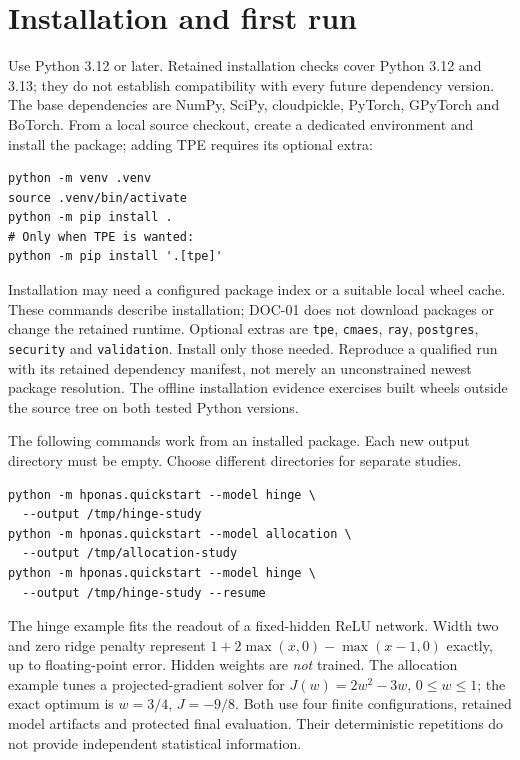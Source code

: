 \section{Installation and first run}

Use Python 3.12 or later. Retained installation checks cover Python 3.12 and
3.13; they do not establish compatibility with every future dependency version.
The base dependencies are NumPy, SciPy, cloudpickle, PyTorch, GPyTorch and
BoTorch. From a local source checkout, create a dedicated environment and
install the package; adding TPE requires its optional extra:

\begin{verbatim}
python -m venv .venv
source .venv/bin/activate
python -m pip install .
# Only when TPE is wanted:
python -m pip install '.[tpe]'
\end{verbatim}

Installation may need a configured package index or a suitable local wheel
cache. These commands describe installation; DOC-01 does not download packages
or change the retained runtime. Optional extras are \texttt{tpe},
\texttt{cmaes}, \texttt{ray}, \texttt{postgres}, \texttt{security} and
\texttt{validation}. Install only those needed. Reproduce a qualified run with
its retained dependency manifest, not merely an unconstrained newest package
resolution. The offline installation evidence exercises built wheels outside
the source tree on both tested Python versions.

The following commands work from an installed package. Each new output
directory must be empty. Choose different directories for separate studies.

\begin{verbatim}
python -m hponas.quickstart --model hinge \
  --output /tmp/hinge-study
python -m hponas.quickstart --model allocation \
  --output /tmp/allocation-study
python -m hponas.quickstart --model hinge \
  --output /tmp/hinge-study --resume
\end{verbatim}

The hinge example fits the readout of a fixed-hidden ReLU network. Width two
and zero ridge penalty represent $1+2\max(x,0)-\max(x-1,0)$ exactly, up to
floating-point error. Hidden weights are \emph{not} trained. The allocation
example tunes a projected-gradient solver for $J(w)=2w^2-3w$, $0\leq w\leq1$;
the exact optimum is $w=3/4$, $J=-9/8$. Both use four finite configurations,
retained model artifacts and protected final evaluation. Their deterministic
repetitions do not provide independent statistical information.

